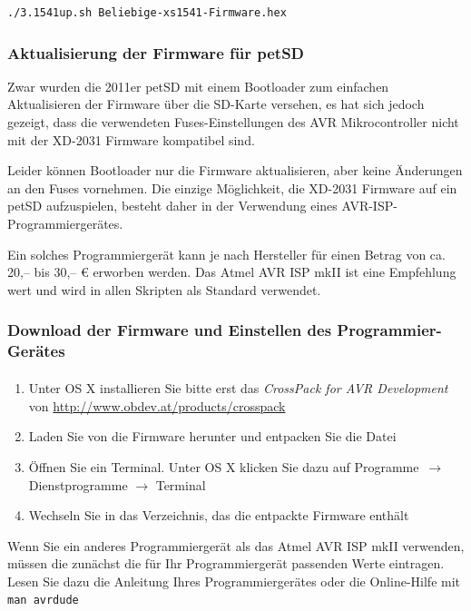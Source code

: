 \documentclass[10pt,a4paper]{scrartcl}		%
\begin{document}
\begin{verbatim}
./3.1541up.sh Beliebige-xs1541-Firmware.hex
\end{verbatim}

\subsubsection{Aktualisierung der Firmware für petSD}
\label{petsdfwinst}
Zwar wurden die 2011er petSD mit einem Bootloader zum einfachen
Aktualisieren der Firmware über die SD-Karte versehen, es hat
sich jedoch gezeigt, dass die verwendeten Fuses-Einstellungen
des AVR Mikrocontroller nicht mit der
\mbox{XD-2031} Firmware kompatibel sind.

Leider können Bootloader nur die Firmware aktualisieren, 
aber keine Änderungen an den Fuses vornehmen. 
Die einzige Möglichkeit, die XD-2031 Firmware
auf ein petSD aufzuspielen, besteht daher in der Verwendung eines
AVR-ISP-Programmiergerätes. 

Ein solches Programmiergerät kann je nach Hersteller 
für einen Betrag von ca. 20,-- bis 30,-- \euro{} erworben werden. 
Das Atmel AVR ISP mkII ist eine Empfehlung wert und wird in allen
Skripten als Standard verwendet.

\subsubsection*{Download der Firmware und Einstellen des
Programmier-Gerätes}
\begin{enumerate}
\item Unter OS X installieren Sie bitte erst das 
\textit{CrossPack for AVR\textsuperscript{\textregistered} Development} von 
\url{http://www.obdev.at/products/crosspack}

\item Laden Sie von \fwbinaries{} die Firmware herunter und entpacken Sie 
die Datei

\item Öffnen Sie ein Terminal. Unter OS X klicken Sie dazu auf 
\glqq Programme\grqq\ $\to$ \glqq Dienstprogramme\grqq
$\to$ \glqq Terminal\grqq{}

\item Wechseln Sie in das Verzeichnis, das die entpackte Firmware enthält
\end{enumerate}

Wenn Sie ein anderes Programmiergerät als das Atmel AVR ISP mkII
verwenden, müssen die zunächst die für Ihr Programmiergerät passenden
Werte eintragen. Lesen Sie dazu die Anleitung Ihres Programmiergerätes oder 
die Online-Hilfe mit \texttt{man avrdude}
\end{document}
